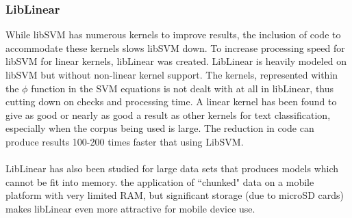 		\subsubsection{LibLinear}  While libSVM has numerous kernels to improve results, the inclusion of code to accommodate these kernels slows libSVM down.  To increase processing speed for libSVM for linear kernels, libLinear was created.  LibLinear is heavily modeled on libSVM but without non-linear kernel support.  The kernels, represented within the $\phi$ function in the SVM equations is not dealt with at all in libLinear, thus cutting down on checks and processing time.   A linear kernel has been found to give as good or nearly as good a result as other kernels for text classification, especially when the corpus being used is large.  The reduction in code can produce results 100-200 times faster that using LibSVM.

			\paragraph{} LibLinear has also been studied for large data sets that produces models which cannot be fit into memory.  the application of ``chunked" data on a mobile platform with very limited RAM, but significant storage (due to microSD cards) makes libLinear even more attractive for mobile device use.
			
